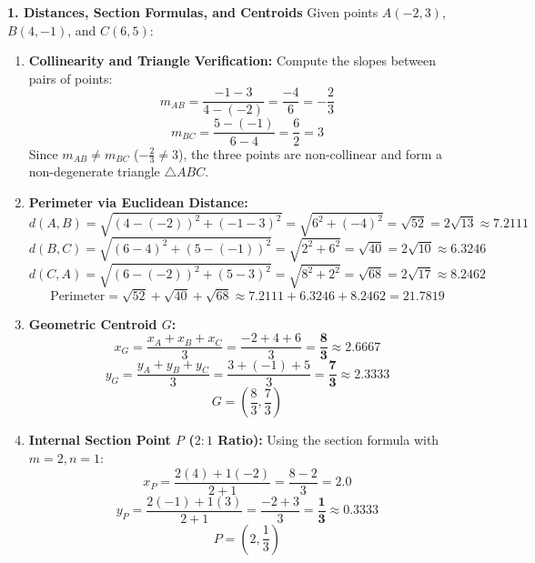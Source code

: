 \textbf{1. Distances, Section Formulas, and Centroids}
Given points $A(-2, 3)$, $B(4, -1)$, and $C(6, 5)$:
\begin{enumerate}
    \item \textbf{Collinearity and Triangle Verification:}
    Compute the slopes between pairs of points:
    $$m_{AB} = \frac{-1 - 3}{4 - (-2)} = \frac{-4}{6} = -\frac{2}{3}$$
    $$m_{BC} = \frac{5 - (-1)}{6 - 4} = \frac{6}{2} = 3$$
    Since $m_{AB} \neq m_{BC}$ ($-\frac{2}{3} \neq 3$), the three points are non-collinear and form a non-degenerate triangle $\triangle ABC$.
    \item \textbf{Perimeter via Euclidean Distance:}
    $$d(A, B) = \sqrt{(4 - (-2))^2 + (-1 - 3)^2} = \sqrt{6^2 + (-4)^2} = \sqrt{52} = 2\sqrt{13} \approx 7.2111$$
    $$d(B, C) = \sqrt{(6 - 4)^2 + (5 - (-1))^2} = \sqrt{2^2 + 6^2} = \sqrt{40} = 2\sqrt{10} \approx 6.3246$$
    $$d(C, A) = \sqrt{(6 - (-2))^2 + (5 - 3)^2} = \sqrt{8^2 + 2^2} = \sqrt{68} = 2\sqrt{17} \approx 8.2462$$
    $$\text{Perimeter} = \sqrt{52} + \sqrt{40} + \sqrt{68} \approx 7.2111 + 6.3246 + 8.2462 = \mathbf{21.7819}$$
    \item \textbf{Geometric Centroid $G$:}
    $$x_G = \frac{x_A + x_B + x_C}{3} = \frac{-2 + 4 + 6}{3} = \mathbf{\frac{8}{3} \approx 2.6667}$$
    $$y_G = \frac{y_A + y_B + y_C}{3} = \frac{3 + (-1) + 5}{3} = \mathbf{\frac{7}{3} \approx 2.3333}$$
    $$G = \left( \frac{8}{3}, \frac{7}{3} \right)$$
    \item \textbf{Internal Section Point $P$ ($2 : 1$ Ratio):}
    Using the section formula with $m = 2, n = 1$:
    $$x_P = \frac{2(4) + 1(-2)}{2 + 1} = \frac{8 - 2}{3} = \mathbf{2.0}$$
    $$y_P = \frac{2(-1) + 1(3)}{2 + 1} = \frac{-2 + 3}{3} = \mathbf{\frac{1}{3} \approx 0.3333}$$
    $$P = \left( 2, \frac{1}{3} \right)$$
\end{enumerate}

